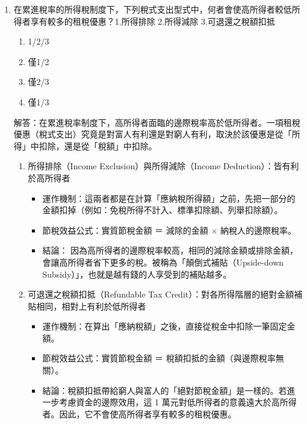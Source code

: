 \documentclass[12pt, a4paper]{article}
\begin{document}
\begin{enumerate}
    \item 在累進稅率的所得稅制度下，下列稅式支出型式中，何者會使高所得者較低所得者享有較多的租稅優惠？1.所得排除 2.所得減除 3.可退還之稅額扣抵
    \begin{enumerate}[label=\Alph*.]
        \item 1/2/3
        \item 僅1/2
        \item 僅2/3
        \item 僅1/3
    \end{enumerate}
    解答：在累進稅率制度下，高所得者面臨的邊際稅率高於低所得者。一項租稅優惠（稅式支出）究竟是對富人有利還是對窮人有利，取決於該優惠是從「所得」中扣除，還是從「稅額」中扣除。
    \begin{enumerate}[1.]
        \item 所得排除（Income Exclusion）與所得減除（Income Deduction）：皆有利於高所得者
        \begin{itemize}
            \item 運作機制：這兩者都是在計算「應納稅所得額」之前，先把一部分的金額扣掉（例如：免稅所得不計入、標準扣除額、列舉扣除額）。
            \item 節稅效益公式：實質節稅金額 ＝ 減除的金額 × 納稅人的邊際稅率。
            \item 結論： 因為高所得者的邊際稅率較高，相同的減除金額或排除金額，會讓高所得者省下更多的稅。被稱為「顛倒式補貼（Upside-down Subsidy）」，也就是越有錢的人享受到的補貼越多。
        \end{itemize}
        \item 可退還之稅額扣抵（Refundable Tax Credit）：對各所得階層的絕對金額補貼相同，相對上有利於低所得者
        \begin{itemize}
            \item 運作機制：在算出「應納稅額」之後，直接從稅金中扣除一筆固定金額。
            \item 節稅效益公式：實質節稅金額 ＝ 稅額扣抵的金額（與邊際稅率無關）。
            \item 結論：稅額扣抵帶給窮人與富人的「絕對節稅金額」是一樣的。若進一步考慮資金的邊際效用，這 1 萬元對低所得者的意義遠大於高所得者。因此，它不會使高所得者享有較多的租稅優惠。
        \end{itemize}
    \end{enumerate}


\end{enumerate}
\end{document}
